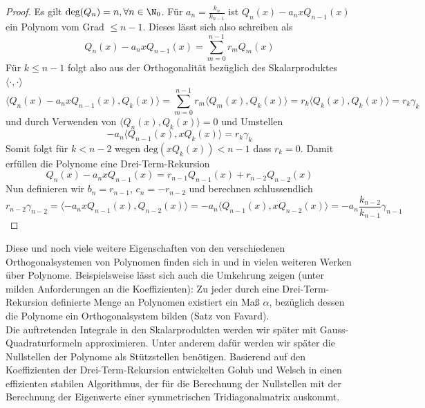 \begin{proof}
Es gilt $\text{deg}(Q_n)=n,\forall n\in\N_0$. Für $a_n=\frac{k_n}{k_{n-1}}$ ist $Q_n(x)-a_nxQ_{n-1}(x)$ ein Polynom vom Grad $\le n-1$. Dieses lässt sich also schreiben als
\[Q_n(x)-a_nxQ_{n-1}(x)=\sum_{m=0}^{n-1}r_mQ_m(x)\]
Für $k\le n-1$ folgt also aus der Orthogonalität bezüglich des Skalarproduktes $\langle\cdot,\cdot\rangle$
\begin{equation*}
\langle Q_n(x)-a_nxQ_{n-1}(x),Q_k(x)\rangle=\sum_{m=0}^{n-1}r_m\langle Q_m(x),Q_k(x)\rangle=r_k\langle Q_k(x),Q_k(x)\rangle=r_k\gamma_k
\end{equation*}
und durch Verwenden von $\langle Q_n(x),Q_k(x)\rangle = 0$ und Umstellen
\[ -a_n\langle Q_{n-1}(x),xQ_k(x)\rangle=r_k\gamma_k\]
Somit folgt für $k<n-2$ wegen $\text{deg}(xQ_k(x))<n-1$ dass $r_k=0$. Damit erfüllen die Polynome eine Drei-Term-Rekursion
\[Q_n(x)-a_nxQ_{n-1}(x)=r_{n-1}Q_{n-1}(x)+r_{n-2}Q_{n-2}(x)\]
Nun definieren wir $b_n=r_{n-1}$, $c_n=-r_{n-2}$ und berechnen schlussendlich
\[r_{n-2}\gamma_{n-2}=\langle -a_nxQ_{n-1}(x),Q_{n-2}(x)\rangle =-a_n\langle Q_{n-1}(x),xQ_{n-2}(x)\rangle=-a_n\frac{k_{n-2}}{k_{n-1}}\gamma_{n-1}\]
\end{proof}
Diese und noch viele weitere Eigenschaften von den verschiedenen Orthogonalsystemen von Polynomen finden sich in \autocite{weborthopoly} und in vielen weiteren Werken über Polynome. Beispielsweise lässt sich auch die Umkehrung zeigen (unter milden Anforderungen an die Koeffizienten): Zu jeder durch eine Drei-Term-Rekursion definierte Menge an Polynomen existiert ein Maß $\alpha$, bezüglich dessen die Polynome ein Orthogonalsystem bilden (Satz von Favard).\\[0.3cm]
Die auftretenden Integrale in den Skalarprodukten werden wir später mit Gauss-Quadraturformeln approximieren. Unter anderem dafür werden wir später die Nullstellen der Polynome als Stützstellen benötigen. Basierend auf den Koeffizienten der Drei-Term-Rekursion entwickelten Golub und Welsch in \autocite{GolubWelsch} einen effizienten stabilen Algorithmus, der für die Berechnung der Nullstellen mit der Berechnung der Eigenwerte einer symmetrischen Tridiagonalmatrix auskommt.

